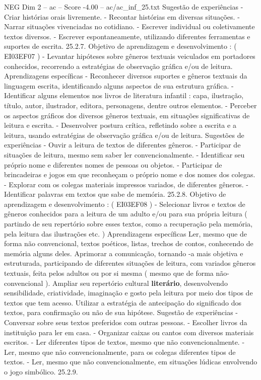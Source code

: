 \begin{textsample}{NEG Dim 2 – ac – Score -4.00 – ac/ac\_inf\_25.txt}
Sugestão de experiências - Criar histórias orais livremente. - Recontar histórias em diversas situações. - Narrar situações vivenciadas no cotidiano. - Escrever individual ou coletivamente textos diversos. - Escrever espontaneamente, utilizando diferentes ferramentas e suportes de escrita. 25.2.7.
Objetivo de aprendizagem e desenvolvimento : ( EI03EF07 ) - Levantar hipóteses sobre gêneros textuais veiculados em portadores conhecidos, recorrendo a estratégias de observação gráfica e/ou de leitura.
Aprendizagens específicas - Reconhecer diversos suportes e gêneros textuais da linguagem escrita, identificando alguns aspectos de sua estrutura gráfica. - Identificar alguns elementos nos livros de literatura infantil : capa, ilustração, título, autor, ilustrador, editora, personagens, dentre outros elementos. - Perceber os aspectos gráficos dos diversos gêneros textuais, em situações significativas de leitura e escrita. - Desenvolver postura crítica, refletindo sobre a escrita e a leitura, usando estratégias de observação gráfica e/ou de leitura.
Sugestões de experiências - Ouvir a leitura de textos de diferentes gêneros. - Participar de situações de leitura, mesmo sem saber ler convencionalmente. - Identificar seu próprio nome e diferentes nomes de pessoas ou objetos. - Participar de brincadeiras e jogos em que reconheçam o próprio nome e dos nomes dos colegas. - Explorar com os colegas materiais impressos variados, de diferentes gêneros. - Identificar palavras em textos que sabe de memória. 25.2.8.
Objetivo de aprendizagem e desenvolvimento : ( EI03EF08 ) - Selecionar livros e textos de gêneros conhecidos para a leitura de um adulto e/ou para sua própria leitura ( partindo de seu repertório sobre esses textos, como a recuperação pela memória, pela leitura das ilustrações etc. ) Aprendizagens específicas Ler, mesmo que de forma não convencional, textos poéticos, listas, trechos de contos, conhecendo de memória alguns deles.
Aprimorar a comunicação, tornando -a mais objetiva e estruturada, participando de diferentes situações de leitura, com variados gêneros textuais, feita pelos adultos ou por si mesma ( mesmo que de forma não-convencional ).
Ampliar seu repertório cultural \textbf{literário}, desenvolvendo sensibilidade, criatividade, imaginação e gosto pela leitura por meio dos tipos de textos que tem acesso.
Utilizar a estratégia de antecipação do significado dos textos, para confirmação ou não de sua hipótese.
Sugestão de experiências - Conversar sobre seus textos preferidos com outras pessoas. - Escolher livros da instituição para ler em casa. - Organizar caixas ou cantos com diversos materiais escritos. - Ler diferentes tipos de textos, mesmo que não convencionalmente. - Ler, mesmo que não convencionalmente, para os colegas diferentes tipos de textos. - Ler, mesmo que não convencionalmente, em situações lúdicas envolvendo o jogo simbólico. 25.2.9.

\end{textsample}
